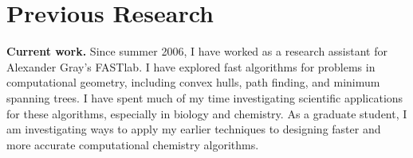 \documentclass[twoside,leqno, 12pt]{article}
\date{}
\begin{document}




\section*{Previous Research}
\textbf{Current work.}  Since summer 2006, I have worked as a research assistant for Alexander Gray's FASTlab.  I have explored fast algorithms for problems in computational geometry, including convex hulls, path finding, and minimum spanning trees.  I have spent much of my time investigating scientific applications for these algorithms, especially in biology and chemistry.  As a graduate student, I am investigating ways to apply my earlier techniques to designing faster and more accurate computational chemistry algorithms.  

\end{document}

